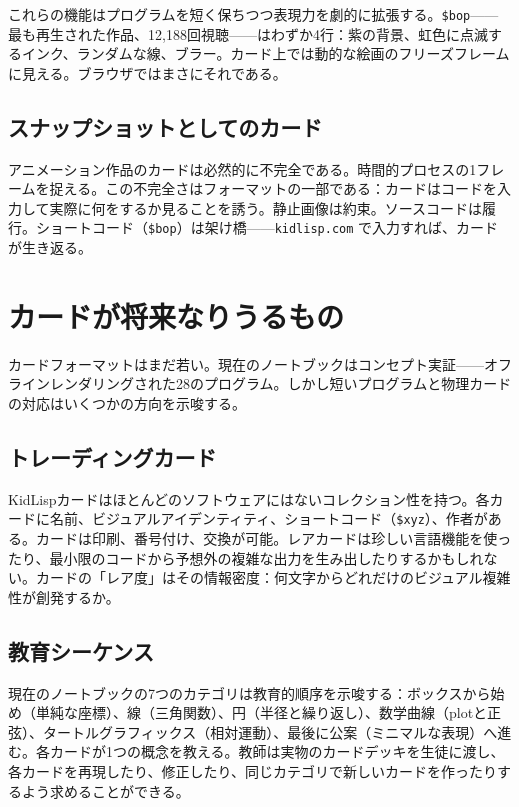 \documentclass[10pt,letterpaper,twocolumn]{article}
\begin{document}
これらの機能はプログラムを短く保ちつつ表現力を劇的に拡張する。\texttt{\$bop}——最も再生された作品、12,188回視聴——はわずか4行：紫の背景、虹色に点滅するインク、ランダムな線、ブラー。カード上では動的な絵画のフリーズフレームに見える。ブラウザではまさにそれである。

\subsection{スナップショットとしてのカード}

アニメーション作品のカードは必然的に不完全である。時間的プロセスの1フレームを捉える。この不完全さはフォーマットの一部である：カードはコードを入力して実際に何をするか見ることを誘う。静止画像は約束。ソースコードは履行。ショートコード（\texttt{\$bop}）は架け橋——\texttt{kidlisp.com} で入力すれば、カードが生き返る。


\section{カードが将来なりうるもの}
\label{sec:futures}

カードフォーマットはまだ若い。現在のノートブックはコンセプト実証——オフラインレンダリングされた28のプログラム。しかし短いプログラムと物理カードの対応はいくつかの方向を示唆する。

\subsection{トレーディングカード}

KidLispカードはほとんどのソフトウェアにはないコレクション性を持つ。各カードに名前、ビジュアルアイデンティティ、ショートコード（\texttt{\$xyz}）、作者がある。カードは印刷、番号付け、交換が可能。レアカードは珍しい言語機能を使ったり、最小限のコードから予想外の複雑な出力を生み出したりするかもしれない。カードの「レア度」はその情報密度：何文字からどれだけのビジュアル複雑性が創発するか。

\subsection{教育シーケンス}

現在のノートブックの7つのカテゴリは教育的順序を示唆する：ボックスから始め（単純な座標）、線（三角関数）、円（半径と繰り返し）、数学曲線（plotと正弦）、タートルグラフィックス（相対運動）、最後に公案（ミニマルな表現）へ進む。各カードが1つの概念を教える。教師は実物のカードデッキを生徒に渡し、各カードを再現したり、修正したり、同じカテゴリで新しいカードを作ったりするよう求めることができる。
\end{document}
